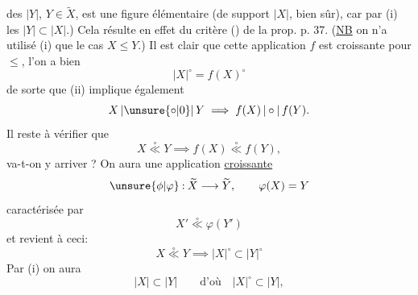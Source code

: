 
des $|Y|$, $Y\in\widetilde X$, est une figure élémentaire (de support $|X|$, bien sûr), car par (i) les $|Y|\subset |X|$.) Cela résulte en effet du critère () de la prop. p. 37. (\uline{NB} on n'a utilisé (i) que  le cas $X\leq Y$.) Il est clair que cette application $f$ est croissante pour $\leq$,
  l'on a bien
\[
 |X|^\circ=f(X)^\circ
\]
de sorte que (ii) implique également
\[
 X\,|\unsure{\circ|0}|\,Y\implies f(X)\,|\circ|\,f(Y).
\]
Il reste à vérifier que
\[
 X\mathrel{\overset{\circ}{\ll}}Y\implies f(X)\mathrel{\overset{\circ}{\ll}}f(Y),
\]
 va-t-on y arriver ? On aura une application \uline{croissante}
\[
 \unsure{\phi|\varphi}\mathbin{:}\widetilde X\longrightarrow\widetilde Y,\qquad \varphi(X)=Y
\]
 caractérisée par
\[
 X'\mathrel{\overset{\circ}{\ll}}\varphi(Y')
\]
et  revient à ceci:
\[
 X\mathrel{\overset{\circ}{\ll}}Y\implies |X|^\circ\subset |Y|^\circ
\]
 Par (i) on aura
\[
 |X|\subset |Y|\qquad\text{d'où}\quad |X|^\circ\subset |Y|,
\]
